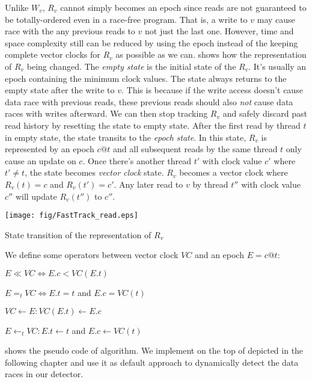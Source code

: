 Unlike $W_v$, $R_v$ cannot simply becomes an epoch since reads are not guaranteed to be totally-ordered even in a race-free program. That is, a write to $v$ may cause race with the any previous reads to $v$ not just the last one. However, time and space complexity still can be reduced by using the epoch instead of the keeping complete vector clocks for $R_v$ as possible as we can.  shows how the representation of $R_v$ being changed. The \textit{empty state} is the initial state of the $R_v$. It's usually an epoch containing the minimum clock values. The state always returns to the empty state after the write to $v$. This is because if the write access doesn't cause data race with previous reads, these previous reads should also \textit{not} cause data races with writes afterward. We can then stop tracking $R_v$ and safely discard past read history by resetting the state to empty state. After the first read by thread $t$ in empty state, the state transits to the \textit{epoch state}. In this state, $R_v$ is represented by an epoch $c@t$ and all subsequent reads by the same thread $t$ only cause an update on $c$. Once there's another thread $t'$ with clock value $c'$ where $t' \not= t$, the state becomes \textit{vector clock} state. $R_v$ becomes a vector clock where $R_v(t) = c$ and $R_v(t') = c'$. Any later read to $v$ by thread $t''$ with clock value $c''$ will update $R_v(t'')$ to $c''$.

\begin{center-figure}
\texttt{[image: fig/FastTrack\_read.eps]}
\caption{State transition of the representation of $R_v$}
\label{fig:FastTrack_read}
\end{center-figure}

We define some operators between vector clock $VC$ and an epoch $E = c@t$:
\begin{definition-box}
	\item $E \ll VC \iff E.c < VC(E.t)$
	\item $E =_t VC \iff E.t = t$ and $E.c = VC(t)$
	\item $VC \gets E: VC(E.t) \gets E.c$
	\item $E \gets_t VC: E.t \gets t$ and $E.c \gets VC(t)$
\end{definition-box}

 shows the pseudo code of \FastTrack{} algorithm. We implement \FastTrack{} on the top of \ThreadTracer{} depicted in the following chapter and use it as default approach to dynamically detect the data races in our detector.


